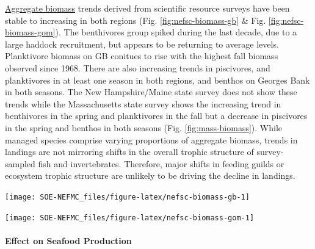 \documentclass[
  10pt,
]{article}
\let\origfigure\figure
\let\endorigfigure\endfigure
\renewenvironment{figure}[1][2] {
    \expandafter\origfigure\expandafter[H]
} {
    \endorigfigure
}
\begin{document}
\href{https://noaa-edab.github.io/catalog/aggregate-survey-biomass.html}{Aggregate biomass} trends derived from scientific resource surveys have been stable to increasing in both regions (Fig. \ref{fig:nefsc-biomass-gb} \& Fig. \ref{fig:nefsc-biomass-gom}). The benthivores group spiked during the last decade, due to a large haddock recruitment, but appears to be returning to average levels. Planktivore biomass on GB conitues to rise with the highest fall biomass observed since 1968. There are also increasing trends in piscivores, and planktivores in at least one season in both regions, and benthos on Georges Bank in both seasons. The New Hampshire/Maine state survey does not show these trends while the Massachusetts state survey shows the increasing trend in benthivores in the spring and planktivores in the fall but a decrease in piscivores in the spring and benthos in both seasons (Fig. \ref{fig:mass-biomass}). While managed species comprise varying proportions of aggregate biomass, trends in landings are not mirroring shifts in the overall trophic structure of survey-sampled fish and invertebrates. Therefore, major shifts in feeding guilds or ecosystem trophic structure are unlikely to be driving the decline in landings.

\begin{figure}

{\centering \texttt{[image: SOE-NEFMC\_files/figure-latex/nefsc-biomass-gb-1]} 

}

\caption{Spring (left) and fall (right) surveyed biomass on Georges Bank. The shaded area around each annual mean represents 2 standard deviations from the mean.}\label{fig:nefsc-biomass-gb}
\end{figure}

\begin{figure}

{\centering \texttt{[image: SOE-NEFMC\_files/figure-latex/nefsc-biomass-gom-1]} 

}

\caption{Spring (left) and fall (right) surveyed biomass in the Gulf of Maine. The shaded area around each annual mean represents 2 standard deviations from the mean.}\label{fig:nefsc-biomass-gom}
\end{figure}

\hypertarget{effect-on-seafood-production}{%
\paragraph{Effect on Seafood Production}\label{effect-on-seafood-production}}
\end{document}
